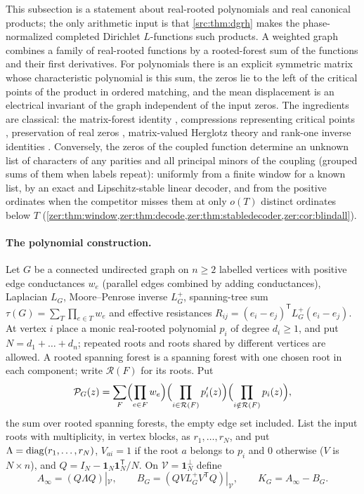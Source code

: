 This subsection is a statement about real-rooted polynomials and real canonical products; the
only arithmetic input is that \cref{src:thm:dgrh} makes the phase-normalized completed Dirichlet
$L$-functions such products. A weighted graph combines a family of real-rooted functions by a
rooted-forest sum of the functions and their first derivatives. For polynomials there is an
explicit symmetric matrix whose characteristic polynomial is this sum, the zeros lie to the left
of the critical points of the product in ordered matching, and the mean displacement is an
electrical invariant of the graph independent of the input zeros. The ingredients are classical:
the matrix-forest identity \cite{ChebotarevShamis2023Forest}, compressions representing critical
points \cite{Pereira2003Differentiators}, preservation of real zeros \cite{BorceaBranden2009LeeYang},
matrix-valued Herglotz theory \cite{Reiffenstein2022Interlacing} and rank-one inverse identities
\cite{SimonovWoracek2024Local}. Conversely, the zeros of the coupled function determine an unknown
list of characters of any parities and all principal minors of the coupling (grouped sums of them when
labels repeat): uniformly from a finite window for a known list, by an exact and Lipschitz-stable linear
decoder, and from the positive ordinates when the competitor misses them at only $o(T)$ distinct
ordinates below $T$ (\cref{zer:thm:window,zer:thm:decode,zer:thm:stabledecoder,zer:cor:blindall}).

\paragraph{The polynomial construction.}
Let $G$ be a connected undirected graph on $n\ge2$ labelled vertices with positive edge
conductances $w_e$ (parallel edges combined by adding conductances), Laplacian $L_G$, Moore--Penrose
inverse $L_G^+$, spanning-tree sum $\tau(G)=\sum_T\prod_{e\in T}w_e$ and effective resistances
$R_{ij}=(e_i-e_j)^{\mathsf T}L_G^+(e_i-e_j)$. At vertex $i$ place a monic real-rooted polynomial
$p_i$ of degree $d_i\ge1$, and put $N=d_1+\dots+d_n$; repeated roots and roots shared by different
vertices are allowed. A rooted spanning forest is a spanning forest with one chosen root in each
component; write $\mathcal R(F)$ for its roots. Put
\begin{equation}\label{zer:eq:forestpoly}
 \mathcal P_G(z)=\sum_{F}\Bigl(\prod_{e\in F}w_e\Bigr)\Bigl(\prod_{i\in\mathcal R(F)}p_i'(z)\Bigr)
 \Bigl(\prod_{i\notin\mathcal R(F)}p_i(z)\Bigr),
\end{equation}
the sum over rooted spanning forests, the empty edge set included. List the input roots with
multiplicity, in vertex blocks, as $r_1,\dots,r_N$, and put $\Lambda=\operatorname{diag}(r_1,\dots,r_N)$,
$V_{ai}=1$ if the root $a$ belongs to $p_i$ and $0$ otherwise ($V$ is $N\times n$), and
$Q=I_N-\mathbf 1_N\mathbf 1_N^{\mathsf T}/N$. On $\mathcal V=\mathbf 1_N^\perp$ define
\[
 A_\infty=(Q\Lambda Q)|_{\mathcal V},\qquad B_G=(QVL_G^+V^{\mathsf T}Q)|_{\mathcal V},\qquad K_G=A_\infty-B_G .
\]

